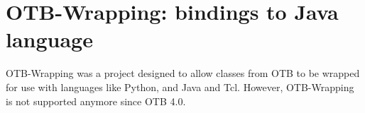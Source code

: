 \section{OTB-Wrapping: bindings to Java language}
OTB-Wrapping was a project designed to allow classes from OTB 
to be wrapped for use with languages like Python, and Java and Tcl. However,
OTB-Wrapping is not supported anymore since OTB 4.0.
